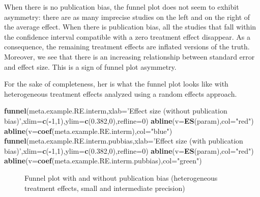 \documentclass[]{book}
\newenvironment{Shaded}{\begin{snugshade}}{\end{snugshade}}
\newcommand{\DataTypeTok}[1]{\textcolor[rgb]{0.13,0.29,0.53}{#1}}
\newcommand{\DecValTok}[1]{\textcolor[rgb]{0.00,0.00,0.81}{#1}}
\newcommand{\FloatTok}[1]{\textcolor[rgb]{0.00,0.00,0.81}{#1}}
\newcommand{\KeywordTok}[1]{\textcolor[rgb]{0.13,0.29,0.53}{\textbf{#1}}}
\newcommand{\NormalTok}[1]{#1}
\newcommand{\OperatorTok}[1]{\textcolor[rgb]{0.81,0.36,0.00}{\textbf{#1}}}
\newcommand{\StringTok}[1]{\textcolor[rgb]{0.31,0.60,0.02}{#1}}
\theoremstyle{definition}
\theoremstyle{definition}
\theoremstyle{definition}
\theoremstyle{remark}
\begin{document}
When there is no publication bias, the funnel plot does not seem to exhibit asymmetry: there are as many imprecise studies on the left and on the right of the average effect.
When there is publication bias, all the studies that fall within the confidence interval compatible with a zero treatment effect disappear.
As a consequence, the remaining treatment effects are inflated versions of the truth.
Moreover, we see that there is an increasing relationship between standard error and effect size.
This is a sign of funnel plot asymmetry.

For the sake of completeness, her is what the funnel plot looks like with heterogeneous treatment effects analyzed using a random effects approach.

\begin{Shaded}
\begin{Highlighting}[]
\KeywordTok{funnel}\NormalTok{(meta.example.RE.interm,}\DataTypeTok{xlab=}\StringTok{'Effect size (without publication bias)'}\NormalTok{,}\DataTypeTok{xlim=}\KeywordTok{c}\NormalTok{(}\OperatorTok{-}\DecValTok{1}\NormalTok{,}\DecValTok{1}\NormalTok{),}\DataTypeTok{ylim=}\KeywordTok{c}\NormalTok{(}\FloatTok{0.382}\NormalTok{,}\DecValTok{0}\NormalTok{),}\DataTypeTok{refline=}\DecValTok{0}\NormalTok{)}
\KeywordTok{abline}\NormalTok{(}\DataTypeTok{v=}\KeywordTok{ES}\NormalTok{(param),}\DataTypeTok{col=}\StringTok{"red"}\NormalTok{)}
\KeywordTok{abline}\NormalTok{(}\DataTypeTok{v=}\KeywordTok{coef}\NormalTok{(meta.example.RE.interm),}\DataTypeTok{col=}\StringTok{"blue"}\NormalTok{)}
\KeywordTok{funnel}\NormalTok{(meta.example.RE.interm.pubbias,}\DataTypeTok{xlab=}\StringTok{'Effect size (with publication bias)'}\NormalTok{,}\DataTypeTok{xlim=}\KeywordTok{c}\NormalTok{(}\OperatorTok{-}\DecValTok{1}\NormalTok{,}\DecValTok{1}\NormalTok{),}\DataTypeTok{ylim=}\KeywordTok{c}\NormalTok{(}\FloatTok{0.382}\NormalTok{,}\DecValTok{0}\NormalTok{),}\DataTypeTok{refline=}\DecValTok{0}\NormalTok{)}
\KeywordTok{abline}\NormalTok{(}\DataTypeTok{v=}\KeywordTok{ES}\NormalTok{(param),}\DataTypeTok{col=}\StringTok{"red"}\NormalTok{)}
\KeywordTok{abline}\NormalTok{(}\DataTypeTok{v=}\KeywordTok{coef}\NormalTok{(meta.example.RE.interm.pubbias),}\DataTypeTok{col=}\StringTok{"green"}\NormalTok{)}
\end{Highlighting}
\end{Shaded}

\begin{figure}[htbp]

{\centering {}

}

\caption{Funnel plot with and without publication bias (heterogeneous treatment effects, small and intermediate precision)}\label{fig:FunnelPlotRE}
\end{figure}
\end{document}
